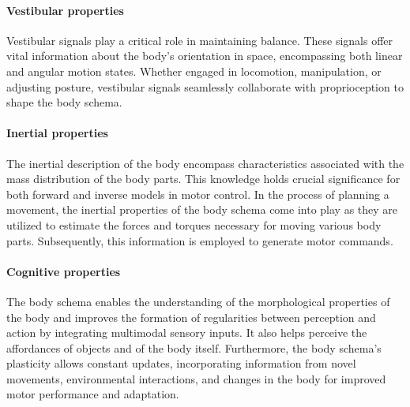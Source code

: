 \paragraph*{Vestibular properties} Vestibular signals play a critical role in maintaining balance. %
These signals offer vital information about the body's orientation in space, encompassing both linear and angular motion states. Whether engaged in locomotion, manipulation, or adjusting posture, vestibular signals seamlessly collaborate with proprioception to shape the body schema.

\paragraph*{Inertial properties} 
The inertial description of the body encompass characteristics associated with the mass distribution of the body parts. This knowledge holds crucial significance for both forward and inverse models in motor control. In the process of planning a movement, the inertial properties of the body schema come into play as they are utilized to estimate the forces and torques necessary for moving various body parts. Subsequently, this information is employed to generate motor commands. %

\paragraph*{Cognitive properties} The body schema enables the understanding of the morphological properties of the body and improves the formation of regularities between perception and action by integrating multimodal sensory inputs. It also helps perceive the affordances of objects and of the body itself. Furthermore, the body schema's plasticity allows constant updates, incorporating information from novel movements, environmental interactions, and changes in the body for improved motor performance and adaptation. %

